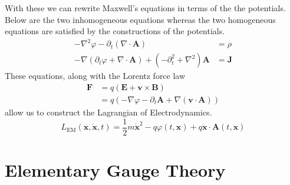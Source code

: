 With these we can rewrite Maxwell's equations in terms of the the potentials.
Below are the two inhomogeneous equations whereas the two homogeneous equations
are satisfied by the constructions of the potentials.
\begin{align}
    -\nabla ^{2}\varphi - \partial_t (\nabla \cdot \mathbf{A})                                & = \rho       \label{eq:maxPot1} \\
    -\nabla(\partial_t\varphi + \nabla\cdot\mathbf{A}) + (-\partial_t^2 + \nabla^2)\mathbf{A} & = \mathbf{J} \label{eq:maxPot2}
\end{align}
These equations, along with the Lorentz force law
\begin{align}\label{eq:lorentz}
    \mathbf{F} & = q\left(\mathbf{E} + \mathbf{v}\times\mathbf{B}\right) \nonumber\\
               & = q\left(-\nabla\varphi - \partial_t\mathbf{A} + \nabla(\mathbf{v}\cdot\mathbf{A})\right)
\end{align}
allow us to construct the Lagrangian of Electrodynamics.
\begin{equation}\label{eq:lagEM}
    L_\text{EM}(\mathbf{x}, \dot{\mathbf{x}},t) = \frac{1}{2}m\dot{\mathbf{x}}^2 - q\varphi(t,\mathbf{x}) + q\dot{\mathbf{x}}\cdot\mathbf{A}(t,\mathbf{x})
\end{equation}


\section{Elementary Gauge Theory}

